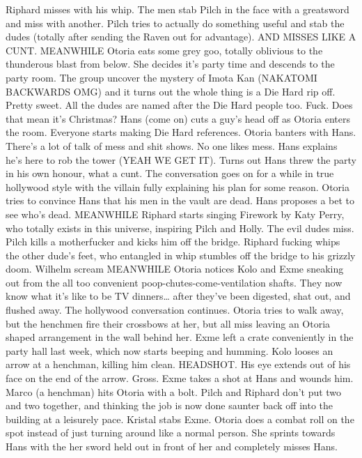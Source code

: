 Riphard misses with his whip.\medskip
The men stab Pilch in the face with a greatsword and miss with another.\medskip
Pilch tries to actually do something useful and stab the dudes (totally after sending the Raven out for advantage). AND MISSES LIKE A CUNT.\medskip
MEANWHILE\medskip
Otoria eats some grey goo, totally oblivious to the thunderous blast from below. She decides it’s party time and descends to the party room.\medskip
The group uncover the mystery of Imota Kan (NAKATOMI BACKWARDS OMG) and it turns out the whole thing is a Die Hard rip off. Pretty sweet. All the dudes are named after the Die Hard people too. Fuck. Does that mean it’s Christmas?\medskip
Hans (come on) cuts a guy's head off as Otoria enters the room. Everyone starts making Die Hard references.\medskip
Otoria banters with Hans. There’s a lot of talk of mess and shit shows. No one likes mess. Hans explains he’s here to rob the tower (YEAH WE GET IT). Turns out Hans threw the party in his own honour, what a cunt. The conversation goes on for a while in true hollywood style with the villain fully explaining his plan for some reason.\medskip
Otoria tries to convince Hans that his men in the vault are dead. Hans proposes a bet to see who’s dead.\medskip
MEANWHILE\medskip
Riphard starts singing Firework by Katy Perry, who totally exists in this universe, inspiring Pilch and Holly.\medskip
The evil dudes miss.\medskip
Pilch kills a motherfucker and kicks him off the bridge.\medskip
Riphard fucking whips the other dude’s feet, who entangled in whip stumbles off the bridge to his grizzly doom. Wilhelm scream\medskip
MEANWHILE\medskip
Otoria notices Kolo and Exme sneaking out from the all too convenient poop-chutes-come-ventilation shafts. They now know what it’s like to be TV dinners… after they’ve been digested, shat out, and flushed away.\medskip
The hollywood conversation continues. Otoria tries to walk away, but the henchmen fire their crossbows at her, but all miss leaving an Otoria shaped arrangement in the wall behind her.\medskip
Exme left a crate conveniently in the party hall last week, which now starts beeping and humming.\medskip
Kolo looses an arrow at a henchman, killing him clean. HEADSHOT. His eye extends out of his face on the end of the arrow. Gross.\medskip
Exme takes a shot at Hans and wounds him.\medskip
Marco (a henchman) hits Otoria with a bolt.\medskip
Pilch and Riphard don’t put two and two together, and thinking the job is now done saunter back off into the building at a leisurely pace.\medskip
Kristal stabs Exme.\medskip
Otoria does a combat roll on the spot instead of just turning around like a normal person. She sprints towards Hans with the her sword held out in front of her and completely misses Hans.\medskip
